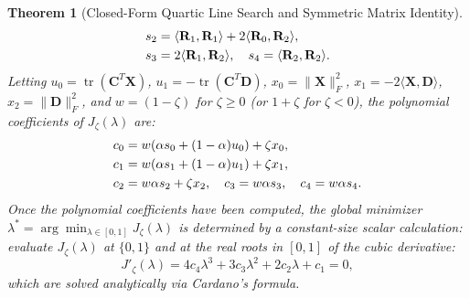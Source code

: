 \documentclass[conference]{IEEEtran}
\newtheorem{theorem}{Theorem}
\begin{document}
\begin{theorem}[Closed-Form Quartic Line Search and Symmetric Matrix Identity]
\begin{align}
s_2 &= \langle \mathbf{R}_1, \mathbf{R}_1 \rangle + 2\langle \mathbf{R}_0, \mathbf{R}_2 \rangle, \notag\\
s_3 &= 2\langle \mathbf{R}_1, \mathbf{R}_2 \rangle, \quad s_4 = \langle \mathbf{R}_2, \mathbf{R}_2 \rangle.
\end{align}
Letting $u_0 = \operatorname{tr}(\mathbf{C}^T\mathbf{X})$, $u_1 = -\operatorname{tr}(\mathbf{C}^T\mathbf{D})$, $x_0 = \|\mathbf{X}\|_F^2$, $x_1 = -2\langle \mathbf{X}, \mathbf{D} \rangle$, $x_2 = \|\mathbf{D}\|_F^2$, and $w = (1 - \zeta)$ for $\zeta \ge 0$ (or $1 + \zeta$ for $\zeta < 0$), the polynomial coefficients of $J_\zeta(\lambda)$ are:
\begin{align}
c_0 &= w(\alpha s_0 + (1-\alpha)u_0) + \zeta x_0, \notag\\
c_1 &= w(\alpha s_1 + (1-\alpha)u_1) + \zeta x_1, \notag\\
c_2 &= w\alpha s_2 + \zeta x_2, \quad c_3 = w\alpha s_3, \quad c_4 = w\alpha s_4.
\end{align}
Once the polynomial coefficients have been computed, the global minimizer $\lambda^* = \arg\min_{\lambda \in [0, 1]} J_\zeta(\lambda)$ is determined by a constant-size scalar calculation: evaluate $J_\zeta(\lambda)$ at $\{0, 1\}$ and at the real roots in $[0, 1]$ of the cubic derivative:
\begin{equation}
J'_\zeta(\lambda) = 4c_4 \lambda^3 + 3c_3 \lambda^2 + 2c_2 \lambda + c_1 = 0,
\label{eq:cubic_root}
\end{equation}
which are solved analytically via Cardano's formula.
\end{theorem}
\end{document}
